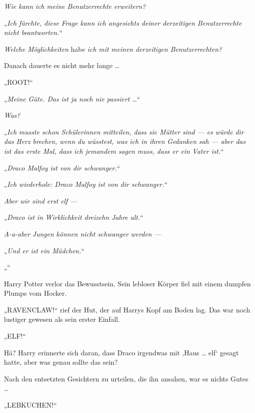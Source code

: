 \emph{Wie kann ich meine Benutzerrechte erweitern?}

„\emph{Ich fürchte, diese Frage kann ich angesichts deiner derzeitigen Benutzerrechte nicht beantworten.}“

\emph{Welche Möglichkeiten} habe \emph{ich mit meinen derzeitigen Benutzerrechten?}

Danach dauerte es nicht mehr lange …

„ROOT!“

\later

„\emph{Meine Güte. Das ist ja noch nie passiert …}“

\emph{Was?}

„\emph{Ich musste schon Schülerinnen mitteilen, dass sie Mütter sind — es würde dir das Herz brechen, wenn du wüsstest, was ich in ihren Gedanken sah — aber das ist das erste Mal, dass ich jemandem sagen muss, dass er ein Vater ist.}“

\emph{}

„\emph{Draco Malfoy ist von dir schwanger.}“

\emph{}

„\emph{Ich wiederhole: Draco Malfoy ist von dir schwanger.}“

\emph{Aber wir sind erst elf —}

„\emph{Draco ist in Wirklichkeit dreizehn Jahre alt.}“

\emph{A-a-aber Jungen können nicht schwanger werden —}

„\emph{Und er ist ein Mädchen.}“

\emph{}

„\emph{}“

Harry Potter verlor das Bewusstsein. Sein lebloser Körper fiel mit einem dumpfen Plumps vom Hocker.

„\uppercase{Ravenclaw}!“ rief der Hut, der auf Harrys Kopf am Boden lag. Das war noch lustiger gewesen als sein erster Einfall.

\later

„ELF!“

Hä? Harry erinnerte sich daran, dass Draco irgendwas mit ‚Haus … elf‘ gesagt hatte, aber was genau sollte das sein?

Nach den entsetzten Gesichtern zu urteilen, die ihn ansahen, war es nichts Gutes …

\later

„\uppercase{Lebkuchen}!“%


